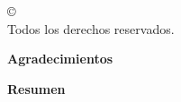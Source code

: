 
  \onehalfspacing


  \cleardoublepage
  \thispagestyle{empty}
  \begin{center}
    \copyright\ \nombreautor\ \the\year{} \\
    Todos los derechos reservados.
  \end{center}


  \cleardoublepage {}
  \begin{center} \Large \textbf{Agradecimientos} \end{center}




  \cleardoublepage
   
  \begin{center} \Large \textbf{Resumen} \end{center}
\resumen





  \cleardoublepage
  \tableofcontents
  \cleardoublepage
  \listoffigures
  \cleardoublepage
  \listoftables
  \cleardoublepage

  \normalsize

